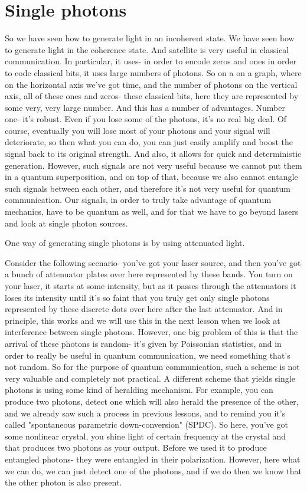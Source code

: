 \section{Single photons}
\label{sec:5-5_single_photons}


So we have seen how to generate light in an incoherent state. We have seen how to generate light in the coherence state. And satellite is very useful in classical communication. In particular, it uses- in order to encode zeros and ones in order to code classical bits, it uses large numbers of photons. So on a on a graph, where on the horizontal axis we've got time, and the number of photons on the vertical axis, all of these ones and zeros- these classical bits, here they are represented by some very, very large number. And this has a number of advantages. Number one- it's robust. Even if you lose some of the photons, it's no real big deal. Of course, eventually you will lose most of your photons and your signal will deteriorate, so then what you can do, you can just easily amplify and boost the signal back to its original strength. And also, it allows for quick and deterministic generation. However, such signals are not very useful because we cannot put them in a quantum superposition, and on top of that, because we also cannot entangle such signals between each other, and therefore it's not very useful for quantum communication. Our signals, in order to truly take advantage of quantum mechanics, have to be quantum as well, and for that we have to go beyond lasers and look at single photon sources.

One way of generating single photons is by using attenuated light.

Consider the following scenario- you've got your laser source, and then you've got a bunch of attenuator plates over here represented by these bands. You turn on your laser, it starts at some intensity, but as it passes through the attenuators it loses its intensity until it's so faint that you truly get only single photons represented by these discrete dots over here after the last attenuator. And in principle, this works and we will use this in the next lesson when we look at interference between single photons. However, one big problem of this is that the arrival of these photons is random- it's given by Poissonian statistics, and in order to really be useful in quantum communication, we need something that's not random. So for the purpose of quantum communication, such a scheme is not very valuable and completely not practical. A different scheme that yields single photons is using some kind of heralding mechanism. For example, you can produce two photons, detect one which will also herald the presence of the other, and we already saw such a process in previous lessons, and to remind you it's called "spontaneous parametric down-conversion" (SPDC). So here, you've got some nonlinear crystal, you shine light of certain frequency at the crystal and that produces two photons as your output. Before we used it to produce entangled photons- they were entangled in their polarization. However, here what we can do, we can just detect one of the photons, and if we do then we know that the other photon is also present.

